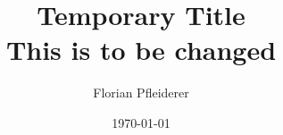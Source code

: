
\subject{Temporary Subject}
\title{Temporary Title \\ \normalsize This is to be changed}
\author{Florian Pfleiderer}
\date{\today}
\maketitle




